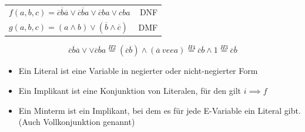 \documentclass[10pt,a4paper]{scrartcl}
\begin{document}
\begin{table}[h!]
	\centering
	\begin{tabular}{lr}
		$ f(a,b,c) = \overline{c}\overline{b}\overline{a} \vee \overline{c}\overline{b}a\vee\overline{c}ba\vee cba  $ & \ac*{DNF}\\
		$ g(a,b,c) = (a\wedge b) \vee (\overline{b} \wedge  \overline{c}) $ & \ac*{DMF}\\
	\end{tabular}
$$ 
\overline{c} \overline{b} \overline{a} \vee \vee \overline{c} \overline{b} a \overset{H2}{=} (\overline{c}\overline{b})\wedge (\overline{a} \ vee  a) \overset{H4}{=} \overline{c} \overline{b} \wedge 1 \overset{H3}{=} \overline{c} \overline{b} 
$$
\end{table}

\begin{itemize}
	\item Ein Literal ist eine Variable in negierter oder nicht-negierter Form
	\item Ein Implikant ist eine Konjunktion von Literalen, für den gilt $ i \implies f $
	\item Ein Minterm ist ein Implikant, bei dem es für jede E-Variable ein Literal gibt. (Auch Vollkonjunktion genannt)
\end{itemize}
\end{document}
